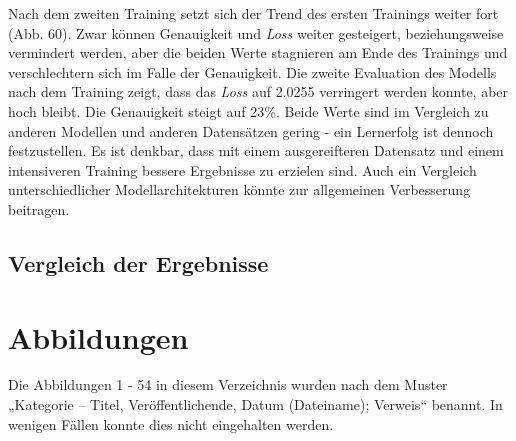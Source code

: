 \documentclass[a4paper,12pt,ngerman]{article}
\begin{document}
Nach dem zweiten Training setzt sich der Trend des ersten Trainings weiter fort (Abb. 60). Zwar können Genauigkeit und \textit{Loss} weiter gesteigert, beziehungsweise vermindert werden, aber die beiden Werte stagnieren am Ende des Trainings und verschlechtern sich im Falle der Genauigkeit. Die zweite Evaluation des Modells nach dem Training zeigt, dass das \textit{Loss} auf 2.0255 verringert werden konnte, aber hoch bleibt. Die Genauigkeit steigt auf 23\%. Beide Werte sind im Vergleich zu anderen Modellen und anderen Datensätzen gering - ein Lernerfolg ist dennoch festzustellen. Es ist denkbar, dass mit einem ausgereifteren Datensatz und einem intensiveren Training bessere Ergebnisse zu erzielen sind. Auch ein Vergleich unterschiedlicher Modellarchitekturen könnte zur allgemeinen Verbesserung beitragen. \\

\subsection{Vergleich der Ergebnisse}


\newpage

\section{Abbildungen}
Die Abbildungen 1 - 54 in diesem Verzeichnis wurden nach dem Muster „Kategorie – Titel, Veröffentlichende, Datum (Dateiname); Verweis“ benannt. In wenigen Fällen konnte dies nicht eingehalten werden. \\
\end{document}
